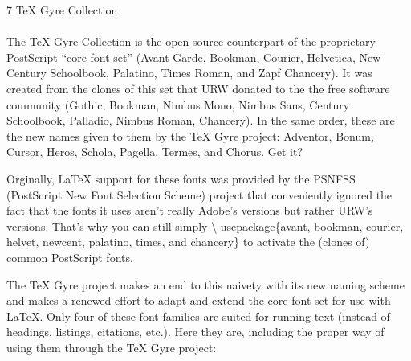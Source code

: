 \documentclass{article}
\begin{document}
\frenchspacing
\noindent
{\LARGE 7 \TeX{} Gyre Collection}\\
~\\
The \TeX{} Gyre Collection is the open source counterpart of the proprietary
Post\-Script ``core font set'' (Avant Garde, Bookman, Courier, Helvetica, New
Century Schoolbook, Palatino, Times Roman, and Zapf Chancery). It was
created from the clones of this set that URW donated to the the free
software community (Gothic, Bookman, Nimbus Mono, Nimbus Sans, Century
Schoolbook, \mbox{Palladio}, Nimbus Roman, Chancery). In the same order,
these are the new names given to them by the \TeX{} Gyre project: Adventor,
Bonum, Cursor, Heros, Schola, Pagella, Termes, and Chorus.  Get it?

Orginally, \LaTeX{} support for these fonts was provided by the PSNFSS
(Post\-Script New Font Selection Scheme) project that conveniently ignored
the fact that the fonts it uses aren't really Adobe's versions but rather
URW's versions.  That's why you can still simply \textbackslash
usepackage\{avant, bookman, courier, helvet, newcent, palatino, times,
and chancery\} to activate the (clones of) common PostScript fonts.

The \TeX{} Gyre project makes an end to this naivety with its new naming
scheme and makes a renewed effort to adapt and extend the core font set for
use with \LaTeX{}.  Only four of these font families are suited for running
text (instead of headings, listings, citations, etc.).  Here they are,
including the proper way of using them through the \TeX{} Gyre project:
\end{document}
